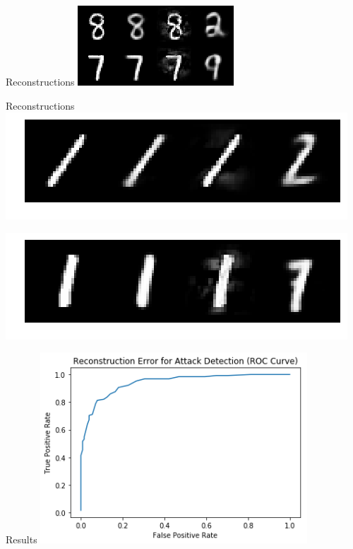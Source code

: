 \documentclass{beamer}
\begin{document}
	\begin{frame}{Reconstructions}
		\centering
		\includegraphics[width=\textwidth]{recon-fig5}
	\end{frame}
	
	\begin{frame}{Reconstructions}
		\centering
		\includegraphics[width=\textwidth]{recon-fig4}		
		
		\includegraphics[width=\textwidth]{recon-fig3}
	\end{frame}
	
	\begin{frame}{Results}
		\centering
		\includegraphics[width=10cm]{mse_roc}
	\end{frame}
	
\end{document}
